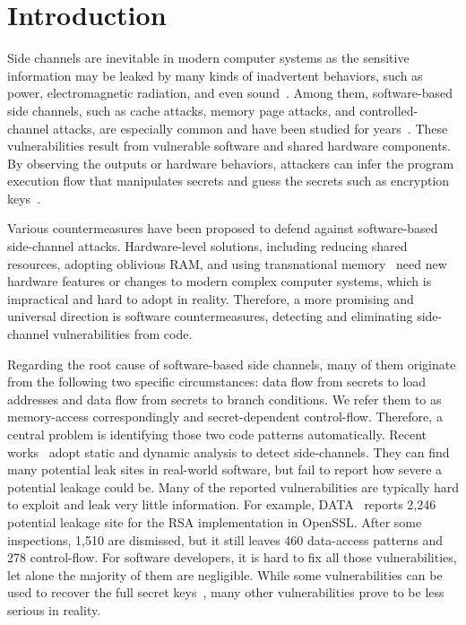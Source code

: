 \section{Introduction}
Side channels are inevitable in modern computer systems as the sensitive
information may be leaked by many kinds of inadvertent behaviors, such as power,
electromagnetic radiation, and even
sound~\cite{agrawal2002side,kar20178,chari1999towards,217605,genkin2014rsa}.
Among them, software-based side channels, such as cache attacks, memory page
attacks, and controlled-channel attacks, are especially common and have been
studied for
years~\cite{7163052,217543,217589,lee2017inferring,191010,liu2015last}. These
vulnerabilities result from vulnerable software and shared hardware components.
By observing the outputs or hardware behaviors, attackers can infer the program
execution flow that manipulates secrets and guess the secrets such as encryption
keys~\cite{Osvik2006,Gullasch:2011:CGB:2006077.2006784,203878,10.1007/978-3-540-45238-6_6}.

Various countermeasures have been proposed to defend against software-based
side-channel attacks. Hardware-level solutions, including reducing shared
resources, adopting oblivious RAM, and using transnational
memory~\cite{203878,217537,shih2017t,Zhang:2015:HDL:2775054.2694372} need new
hardware features or changes to modern complex computer systems, which is
impractical and hard to adopt in reality. Therefore, a more promising and
universal direction is software countermeasures, detecting and eliminating
side-channel vulnerabilities from code.

Regarding the root cause of software-based side channels, many of them originate
from the following two specific circumstances: data flow from secrets to load
addresses and data flow from secrets to branch conditions. We refer them to as
memory-access correspondingly and secret-dependent control-flow. Therefore, a
central problem is identifying those two code patterns automatically. Recent
works~\cite{203878,217537,Wichelmann:2018:MFF:3274694.3274741,Brotzman19Casym,236338,182946}
adopt static and dynamic analysis to detect side-channels. They can find many
potential leak sites in real-world software, but fail to report how severe a
potential leakage could be. Many of the reported vulnerabilities are typically
hard to exploit and leak very little information. For example,
DATA~\cite{217537} reports 2,246 potential leakage site for the RSA
implementation in OpenSSL\@. After some inspections, 1,510 are dismissed, but it
still leaves 460 data-access patterns and 278 control-flow. For software
developers, it is hard to fix all those vulnerabilities, let alone the majority
of them are negligible. While some vulnerabilities can be used to recover the
full secret keys~\cite{184415}, many other vulnerabilities prove to be less
serious in reality.

